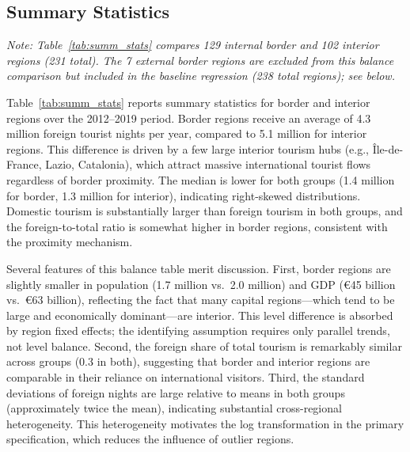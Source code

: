 \documentclass[12pt]{article}
\newcommand{\EUR}[1]{\euro#1}
\begin{document}
\subsection{Summary Statistics}



\noindent\textit{Note: Table~\ref{tab:summ_stats} compares 129 internal border and 102 interior regions (231 total). The 7 external border regions are excluded from this balance comparison but included in the baseline regression (238 total regions); see below.}

\medskip

Table~\ref{tab:summ_stats} reports summary statistics for border and interior regions over the 2012--2019 period. Border regions receive an average of 4.3 million foreign tourist nights per year, compared to 5.1 million for interior regions. This difference is driven by a few large interior tourism hubs (e.g., \^{I}le-de-France, Lazio, Catalonia), which attract massive international tourist flows regardless of border proximity. The median is lower for both groups (1.4 million for border, 1.3 million for interior), indicating right-skewed distributions. Domestic tourism is substantially larger than foreign tourism in both groups, and the foreign-to-total ratio is somewhat higher in border regions, consistent with the proximity mechanism.

Several features of this balance table merit discussion. First, border regions are slightly smaller in population (1.7 million vs.\ 2.0 million) and GDP (\EUR{45} billion vs.\ \EUR{63} billion), reflecting the fact that many capital regions---which tend to be large and economically dominant---are interior. This level difference is absorbed by region fixed effects; the identifying assumption requires only parallel trends, not level balance. Second, the foreign share of total tourism is remarkably similar across groups (0.3 in both), suggesting that border and interior regions are comparable in their reliance on international visitors. Third, the standard deviations of foreign nights are large relative to means in both groups (approximately twice the mean), indicating substantial cross-regional heterogeneity. This heterogeneity motivates the log transformation in the primary specification, which reduces the influence of outlier regions.
\end{document}
